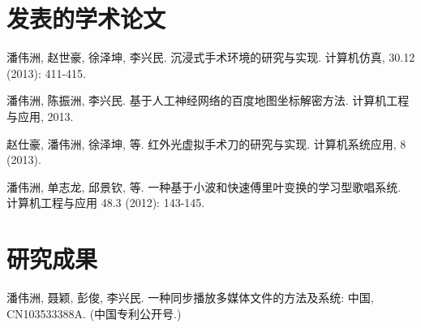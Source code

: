 \begin{resume}

  \section*{发表的学术论文} %

  \begin{enumerate}[{[}1{]}]
  \addtolength{\itemsep}{-.36\baselineskip}%
  \item 潘伟洲, 赵世豪, 徐泽坤, 李兴民. 沉浸式手术环境的研究与实现. 计算机仿真,
  30.12 (2013): 411-415.
  \item 潘伟洲, 陈振洲, 李兴民. 基于人工神经网络的百度地图坐标解密方法.
    计算机工程与应用, 2013.
  \item 赵仕豪, 潘伟洲, 徐泽坤, 等. 红外光虚拟手术刀的研究与实现. 计算机系统应用,
    8 (2013).
  \item 潘伟洲, 单志龙, 邱景钦, 等. 一种基于小波和快速傅里叶变换的学习型歌唱系统.
    计算机工程与应用 48.3 (2012): 143-145.
  \end{enumerate}

  \section*{研究成果} %
  \begin{enumerate}[{[}1{]}]
  \addtolength{\itemsep}{-.36\baselineskip}%
  \item 潘伟洲, 聂颖, 彭俊, 李兴民. 一种同步播放多媒体文件的方法及系统: 中国, CN103533388A. (中国专利公开号.)
  \end{enumerate}
\end{resume}
